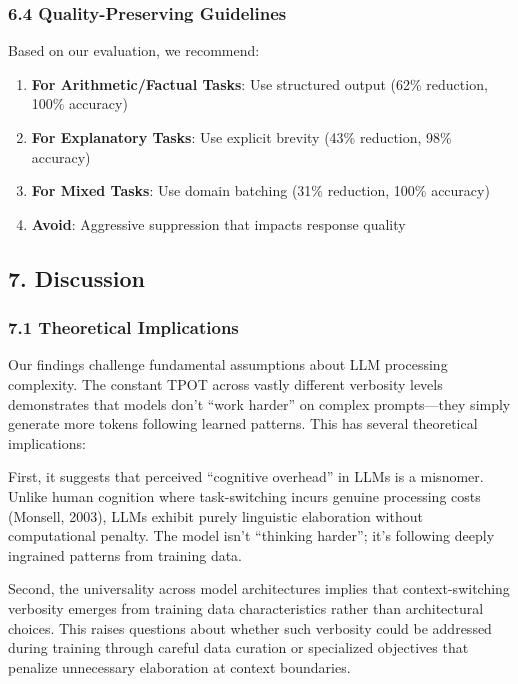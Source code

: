 \documentclass[
  11pt]{article}
\providecommand{\tightlist}{%
  \setlength{\itemsep}{0pt}\setlength{\parskip}{0pt}}
\begin{document}
\subsubsection{6.4 Quality-Preserving
Guidelines}\label{quality-preserving-guidelines}

Based on our evaluation, we recommend:

\begin{enumerate}
\def\labelenumi{\arabic{enumi}.}
\tightlist
\item
  \textbf{For Arithmetic/Factual Tasks}: Use structured output (62\%
  reduction, 100\% accuracy)
\item
  \textbf{For Explanatory Tasks}: Use explicit brevity (43\% reduction,
  98\% accuracy)
\item
  \textbf{For Mixed Tasks}: Use domain batching (31\% reduction, 100\%
  accuracy)
\item
  \textbf{Avoid}: Aggressive suppression that impacts response quality
\end{enumerate}

\subsection{7. Discussion}\label{discussion}

\subsubsection{7.1 Theoretical
Implications}\label{theoretical-implications}

Our findings challenge fundamental assumptions about LLM processing
complexity. The constant TPOT across vastly different verbosity levels
demonstrates that models don't ``work harder'' on complex prompts---they
simply generate more tokens following learned patterns. This has several
theoretical implications:

First, it suggests that perceived ``cognitive overhead'' in LLMs is a
misnomer. Unlike human cognition where task-switching incurs genuine
processing costs (Monsell, 2003), LLMs exhibit purely linguistic
elaboration without computational penalty. The model isn't ``thinking
harder''; it's following deeply ingrained patterns from training data.

Second, the universality across model architectures implies that
context-switching verbosity emerges from training data characteristics
rather than architectural choices. This raises questions about whether
such verbosity could be addressed during training through careful data
curation or specialized objectives that penalize unnecessary elaboration
at context boundaries.
\end{document}
